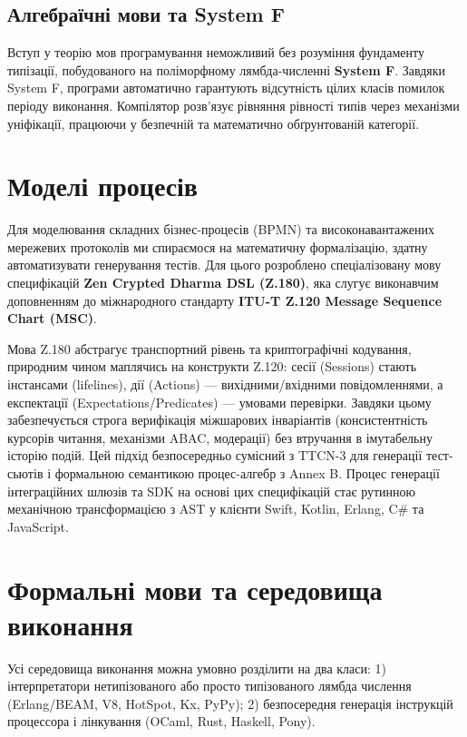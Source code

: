 \subsection{Алгебраїчні мови та System F}
Вступ у теорію мов програмування неможливий без розуміння фундаменту типізації, побудованого на поліморфному лямбда-численні \textbf{System F}. Завдяки System F, програми автоматично гарантують відсутність цілих класів помилок періоду виконання. Компілятор розв'язує рівняння рівності типів через механізми уніфікації, працюючи у безпечній та математично обґрунтованій категорії.

\section{Моделі процесів}

Для моделювання складних бізнес-процесів (BPMN) та високонавантажених мережевих протоколів ми спираємося на математичну формалізацію, здатну автоматизувати генерування тестів. Для цього розроблено спеціалізовану мову специфікацій \textbf{Zen Crypted Dharma DSL (Z.180)}, яка слугує виконавчим доповненням до міжнародного стандарту \textbf{ITU-T Z.120 Message Sequence Chart (MSC)}. 

Мова Z.180 абстрагує транспортний рівень та криптографічні кодування, природним чином маплячись на конструкти Z.120: сесії (Sessions) стають інстансами (lifelines), дії (Actions) — вихідними/вхідними повідомленнями, а експектації (Expectations/Predicates) — умовами перевірки. Завдяки цьому забезпечується строга верифікація міжшарових інваріантів (консистентність курсорів читання, механізми ABAC, модерації) без втручання в імутабельну історію подій. Цей підхід безпосередньо сумісний з TTCN-3 для генерації тест-сьютів і формальною семантикою процес-алгебр з Annex B. Процес генерації інтеграційних шлюзів та SDK на основі цих специфікацій стає рутинною механічною трансформацією з AST у клієнти Swift, Kotlin, Erlang, C\# та JavaScript.

\section{Формальні мови та середовища виконання}

Усі середовища виконання можна умовно розділити на два класи:
1) інтерпретатори нетипізованого або просто типізованого лямбда числення (Erlang/BEAM, V8, HotSpot, Kx, PyPy);
2) безпосередня генерація інструкцій процессора і лінкування (OCaml, Rust, Haskell, Pony).

